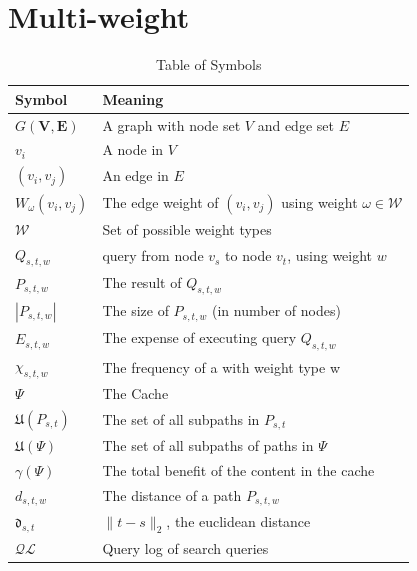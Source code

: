 \section{Multi-weight} \label{sec:intro}


\begin{table}
\begin{tabular*}{\columnwidth}{|l|p{}|}
\hline
\bf Symbol		& \bf Meaning \\\hline
$G\mathbf{(V,E)}$ 	& A graph with node set $V$ and edge set $E$ \\\hline 
$v_i$			& A node in $V$ \\\hline 
$(v_i,v_j)$		& An edge in $E$ \\\hline 
$W_\omega(v_i,v_j)$	& The edge weight of $(v_i,v_j)$ using weight $\omega \in \mathcal{W}$ \\\hline
$\mathcal{W}$		& Set of possible weight types \\\hline

$Q_{s,t,w}$		& \spath query from node $v_s$ to node $v_t$, using weight $w$\\\hline
$P_{s,t,w}$		& The \spath result of $Q_{s,t,w}$ \\\hline
$|P_{s,t,w}|$		& The size of $P_{s,t,w}$ (in number of nodes) \\\hline
$E_{s,t,w}$		& The expense of executing query $Q_{s,t,w}$ \\\hline
$\chi_{s,t,w}$		& The frequency of a \spath with weight type w \\\hline
$\Psi$ 			& The Cache \\\hline
$\mathfrak{U}(P_{s,t})$	& The set of all subpaths in $P_{s,t}$ \\\hline
$\mathfrak{U}(\Psi)$	& The set of all subpaths of paths in $\Psi$ \\\hline
$\gamma(\Psi)$		& The total benefit of the content in the cache \\\hline

$d_{s,t,w}$		& The \spath distance of a path $P_{s,t,w}$ \\\hline
$\mathfrak{d}_{s,t}$	& $\| t - s \|_2$, the euclidean distance \\\hline

$\mathcal{QL}$		& Query log of search queries \\\hline
\end{tabular*}
\caption{Table of Symbols}
\label{tab:symbols}
\end{table}

% 
% 
% 
% 
% 
% 
% 
% 
% 
% 

